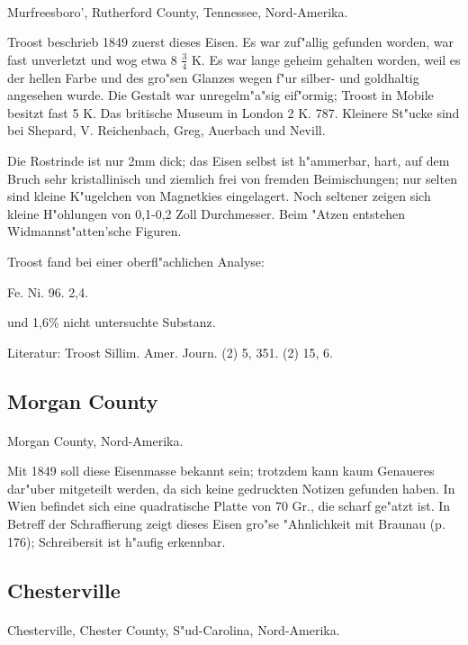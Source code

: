 \documentclass[a4paper, 11pt, oneside]{article}
\begin{document}
\paragraph{}
Murfreesboro', Rutherford County, Tennessee, Nord-Amerika.

Troost beschrieb 1849 zuerst dieses Eisen. Es war zuf"allig gefunden worden, war fast unverletzt und wog etwa 8 $\frac{3}{4}$ K. Es war lange geheim gehalten worden, weil es der hellen Farbe und des gro"sen Glanzes wegen f"ur silber- und goldhaltig angesehen wurde. Die Gestalt war unregelm"a"sig eif"ormig; Troost in Mobile besitzt fast 5 K. Das britische Museum in London 2 K. 787. Kleinere St"ucke sind bei Shepard, V. Reichenbach, Greg, Auerbach und Nevill.

Die Rostrinde ist nur 2mm dick; das Eisen selbst ist h"ammerbar, hart, auf dem Bruch sehr kristallinisch und ziemlich frei von fremden Beimischungen; nur selten sind kleine K"ugelchen von Magnetkies eingelagert. Noch seltener zeigen sich kleine H"ohlungen von 0,1-0,2 Zoll Durchmesser. Beim "Atzen entstehen Widmannst"atten'sche Figuren.

Troost fand bei einer oberfl"achlichen Analyse:

Fe. Ni.  
96. 2,4.

und 1,6\% nicht untersuchte Substanz.

Literatur: Troost Sillim. Amer. Journ. (2) 5, 351. (2) 15, 6.

\subsection{Morgan County}
\normalsize
\paragraph{}
Morgan County, Nord-Amerika.

Mit 1849 soll diese Eisenmasse bekannt sein; trotzdem kann kaum Genaueres dar"uber mitgeteilt werden, da sich keine gedruckten Notizen gefunden haben. In Wien befindet sich eine quadratische Platte von 70 Gr., die scharf ge"atzt ist. In Betreff der Schraffierung zeigt dieses Eisen gro"se "Ahnlichkeit mit Braunau (p. 176); Schreibersit ist h"aufig erkennbar.

\subsection{Chesterville}
\paragraph{}
Chesterville, Chester County, S"ud-Carolina, Nord-Amerika.
\end{document}
